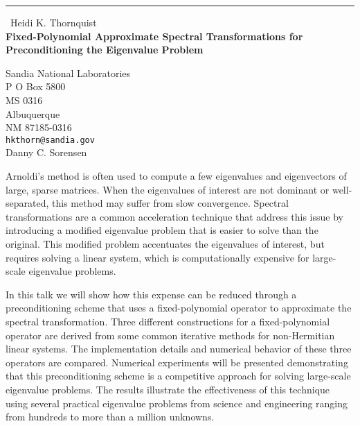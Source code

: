 \documentclass{report}
\begin{document}
\begin{center}
\rule{6in}{1pt} \
{\large Heidi K. Thornquist \\
{\bf Fixed-Polynomial Approximate Spectral Transformations for Preconditioning the Eigenvalue Problem}}

Sandia National Laboratories \\ P O Box 5800 \\ MS 0316 \\ Albuquerque \\ NM 87185-0316
\\
{\tt hkthorn@sandia.gov}\\
Danny C. Sorensen\end{center}

Arnoldi's method is often used to compute a few eigenvalues and
eigenvectors of large, sparse matrices. When the eigenvalues of interest
are not dominant or well-separated, this method may suffer from slow
convergence. Spectral transformations are a common acceleration technique
that address this issue by introducing a modified eigenvalue problem that
is easier to solve than the original. This modified problem accentuates
the eigenvalues of interest, but requires solving a linear system, which
is
computationally expensive for large-scale eigenvalue problems.

In this talk we will show how this expense can be reduced through a
preconditioning scheme that uses a fixed-polynomial operator to
approximate the spectral transformation. Three different constructions
for a fixed-polynomial operator are derived from some
common iterative methods for non-Hermitian linear systems.
The implementation details and numerical behavior of these three
operators are compared. Numerical experiments will be presented
demonstrating that this preconditioning scheme is a competitive approach
for solving large-scale eigenvalue problems. The results
illustrate the effectiveness of this technique using several practical
eigenvalue problems from science and engineering ranging from hundreds to
more than a million unknowns.
\end{document}
